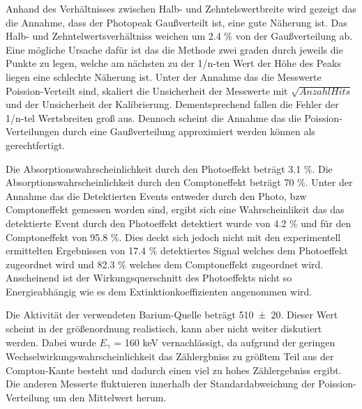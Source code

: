 Anhand des Verhältnisses zwischen Halb- und Zehntelswertbreite wird gezeigt das die Annahme, dass der Photopeak Gaußverteilt ist, eine gute Näherung ist. Das Halb- und Zehntelwertsverhältniss weichen um 2.4 \% von der Gaußverteilung ab. Eine mögliche Ursache dafür ist das die Methode zwei graden durch jeweils die Punkte zu legen, welche am nächsten zu der 1/n-ten Wert der Höhe des Peaks liegen eine schlechte Näherung ist. Unter der Annahme das die Messwerte Poission-Verteilt sind, skaliert die Unsicherheit der Messwerte mit $\sqrt{Anzahl Hits}$ und der Unsicherheit der Kalibrierung. Dementsprechend fallen die Fehler der 1/n-tel Wertsbreiten groß aus. Dennoch scheint die Annahme das die Poission-Verteilungen durch eine Gaußverteilung approximiert werden können als gerechtfertigt. 

Die Absorptionswahrscheinlichkeit durch den Photoeffekt beträgt 3.1 \%. Die Absorptionswahrscheinlichkeit durch den Comptoneffekt beträgt 70 \%. Unter der Annahme das die Detektierten Events entweder durch den Photo, bzw Comptoneffekt gemessen worden sind, ergibt sich eine Wahrscheinlikeit das das detektierte Event durch den Photoeffekt detektiert wurde von 4.2 \% und für den Comptoneffekt von 95.8 \%. Dies deckt sich jedoch nicht mit den experimentell ermittelten Ergebnissen von 17.4 \% detektiertes Signal welches dem Photoeffekt zugeordnet wird und 82.3 \% welches dem Comptoneffekt zugeordnet wird. Anscheinend ist der Wirkungsquerschnitt des Photoeffekts nicht so Energieabhängig wie es dem Extinktionkoeffizienten angenommen wird. 

Die Aktivität der verwendeten Barium-Quelle beträgt \num{510 +- 20}. Dieser Wert scheint in der größenordnung realistisch, kann aber nicht weiter diskutiert werden. Dabei wurde $E_\gamma$ = 160 keV vernachlässigt, da aufgrund der geringen Wechselwirkungswahrscheinlichkeit das Zählergbniss zu größtem Teil aus der Compton-Kante besteht und dadurch einen viel zu hohes Zählergebniss ergibt. Die anderen Messerte fluktuieren innerhalb der Standardabweichung der Poission-Verteilung um den Mittelwert herum.  

